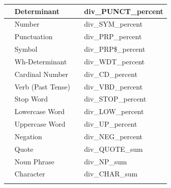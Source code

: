 \documentclass{article}
\begin{document}
\begin{longtable}[c]{| >{\centering\arraybackslash}p{} | >{\centering\arraybackslash}p{} | >{\centering\arraybackslash}p{} | >{\centering\arraybackslash}p{} |}
                                   & Determinant                          &                           & div\_PUNCT\_percent         \\ \cline{2-2} \cline{4-4} 
                                   & Number                               &                           & div\_SYM\_percent           \\ \cline{2-2} \cline{4-4} 
                                   & Punctuation                          &                           & div\_PRP\_percent           \\ \cline{2-2} \cline{4-4} 
                                   & Symbol                               &                           & div\_PRP\$\_percent         \\ \cline{2-2} \cline{4-4} 
                                   & Wh-Determinant                       &                           & div\_WDT\_percent           \\ \cline{2-2} \cline{4-4} 
                                   & Cardinal Number                      &                           & div\_CD\_percent            \\ \cline{2-2} \cline{4-4} 
                                   & Verb (Past Tense)                    &                           & div\_VBD\_percent           \\ \cline{2-2} \cline{4-4} 
                                   & Stop Word                            &                           & div\_STOP\_percent          \\ \cline{2-2} \cline{4-4} 
                                   & Lowercase Word                       &                           & div\_LOW\_percent           \\ \cline{2-2} \cline{4-4} 
                                   & Uppercase Word                       &                           & div\_UP\_percent            \\ \cline{2-2} \cline{4-4} 
                                   & Negation                             &                           & div\_NEG\_percent           \\ \cline{2-4} 
                                   & Quote                                & \multirow{6}{*}{Count}    & div\_QUOTE\_sum             \\ \cline{2-2} \cline{4-4} 
                                   & Noun Phrase                          &                           & div\_NP\_sum                \\ \cline{2-2} \cline{4-4} 
                                   & Character                            &                           & div\_CHAR\_sum              \\ \cline{2-2} \cline{4-4} 

\end{longtable}
\end{document}
